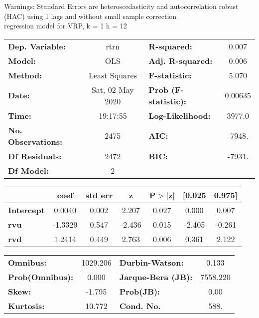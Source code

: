 Warnings: \newline
 [1] Standard Errors are heteroscedasticity and autocorrelation robust (HAC) using 1 lags and without small sample correction\\ 

regression model for VRP, k = 1 h = 12\begin{center}
\begin{tabular}{lclc}
\toprule
\textbf{Dep. Variable:}    &       rtrn       & \textbf{  R-squared:         } &     0.007   \\
\textbf{Model:}            &       OLS        & \textbf{  Adj. R-squared:    } &     0.006   \\
\textbf{Method:}           &  Least Squares   & \textbf{  F-statistic:       } &     5.070   \\
\textbf{Date:}             & Sat, 02 May 2020 & \textbf{  Prob (F-statistic):} &  0.00635    \\
\textbf{Time:}             &     19:17:55     & \textbf{  Log-Likelihood:    } &    3977.0   \\
\textbf{No. Observations:} &        2475      & \textbf{  AIC:               } &    -7948.   \\
\textbf{Df Residuals:}     &        2472      & \textbf{  BIC:               } &    -7931.   \\
\textbf{Df Model:}         &           2      & \textbf{                     } &             \\
\bottomrule
\end{tabular}
\begin{tabular}{lcccccc}
                   & \textbf{coef} & \textbf{std err} & \textbf{z} & \textbf{P$> |$z$|$} & \textbf{[0.025} & \textbf{0.975]}  \\
\midrule
\textbf{Intercept} &       0.0040  &        0.002     &     2.207  &         0.027        &        0.000    &        0.007     \\
\textbf{rvu}       &      -1.3329  &        0.547     &    -2.436  &         0.015        &       -2.405    &       -0.261     \\
\textbf{rvd}       &       1.2414  &        0.449     &     2.763  &         0.006        &        0.361    &        2.122     \\
\bottomrule
\end{tabular}
\begin{tabular}{lclc}
\textbf{Omnibus:}       & 1029.206 & \textbf{  Durbin-Watson:     } &    0.133  \\
\textbf{Prob(Omnibus):} &   0.000  & \textbf{  Jarque-Bera (JB):  } & 7558.220  \\
\textbf{Skew:}          &  -1.795  & \textbf{  Prob(JB):          } &     0.00  \\
\textbf{Kurtosis:}      &  10.772  & \textbf{  Cond. No.          } &     588.  \\
\bottomrule
\end{tabular}
\end{center}

